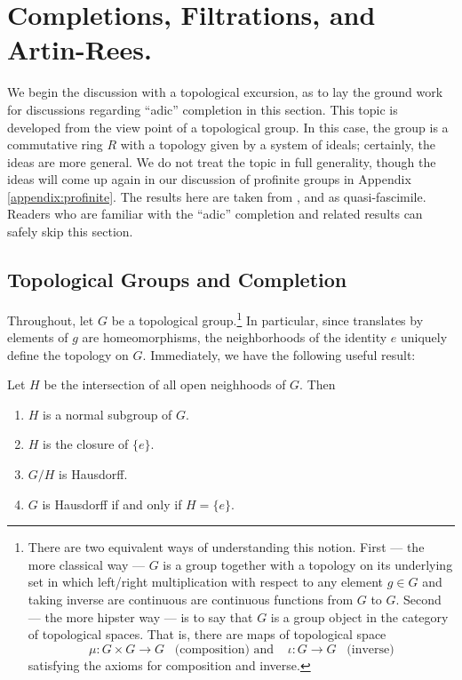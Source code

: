 \section{Completions, Filtrations, and Artin-Rees.}

We begin the discussion with a topological excursion, as to lay 
the ground work for discussions regarding ``adic'' completion in 
this section. This topic is developed from the view point of a 
topological group. In this case, the group is a commutative ring 
$R$ with a topology given by a system of ideals; certainly, the 
ideas are more general. We do not treat the topic in full 
generality, though the ideas will come up again in our discussion 
of profinite groups in Appendix \ref{appendix:profinite}. The
results here are taken from \cite{AM}, \cite{MatsCA} and 
\cite{Eisenbud} as quasi-fascimile. Readers who are familiar with
the ``adic'' completion and related results can safely skip this
section.

\subsection{Topological Groups and Completion}

Throughout, let $G$ be a topological group.\footnote{There are two 
equivalent ways of understanding this notion. First --- the more 
classical way --- $G$ is a group together with a topology on its 
underlying set in which left/right multiplication with respect to 
any element $g \in G$ and taking inverse are continuous are 
continuous functions from $G$ to $G$.  Second --- the more hipster 
way --- is to say that $G$ is a group object in the category of 
topological spaces. That is, there are maps of topological space
\[
\mu: G \times G \to G\;\;\;\textrm{(composition) and}\;\;\;\;
\iota: G \to G\;\;\;\textrm{(inverse)}
\]
satisfying the axioms for composition and inverse.} In particular, 
since translates by elements of $g$ are homeomorphisms, the 
neighborhoods of the identity $e$ uniquely define the topology on 
$G$. Immediately, we have the following useful result:

\begin{lem}\label{lem:top_grp_neigh_props}
Let $H$ be the intersection of all open neighhoods of $G$. Then
\begin{enumerate}
\item $H$ is a normal subgroup of $G$.

\item $H$ is the closure of $\{e\}$.

\item $G/H$ is Hausdorff.

\item $G$ is Hausdorff if and only if $H = \{e\}$.
\end{enumerate}
\end{lem}

